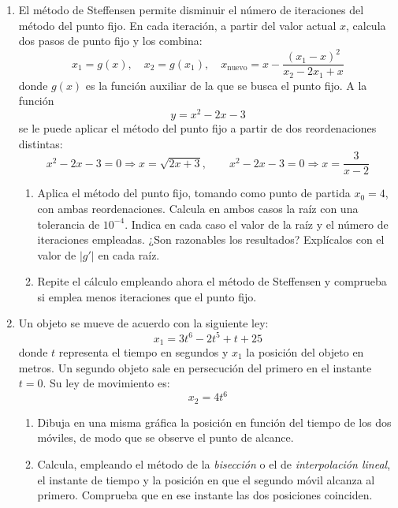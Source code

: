 \begin{enumerate}
\item El método de Steffensen permite disminuir el número de iteraciones del método del punto fijo. En cada iteración, a partir del valor actual $x$, calcula dos pasos de punto fijo y los combina:
\begin{equation*}
x_1=g(x),\quad x_2=g(x_1),\quad x_{\text{nuevo}} = x - \frac{(x_1 -x)^2}{x_2 - 2x_1 + x}
\end{equation*}
donde $g(x)$ es la función auxiliar de la que se busca el punto fijo. A la función
\begin{equation*}
y= x^2-2x-3
\end{equation*}
se le puede aplicar el método del punto fijo a partir de dos reordenaciones distintas:
\begin{equation*}
x^2-2x-3=0 \Rightarrow x=\sqrt{2x+3}, \qquad x^2-2x-3=0 \Rightarrow x=\frac{3}{x-2}
\end{equation*}
\begin{enumerate}
\item Aplica el método del punto fijo, tomando como punto de partida $x_0=4$, con ambas reordenaciones. Calcula en ambos casos la raíz con una tolerancia de $10^{-4}$. Indica en cada caso el valor de la raíz y el número de iteraciones empleadas. ¿Son razonables los resultados? Explícalos con el valor de $\vert g'\vert$ en cada raíz.
\item Repite el cálculo empleando ahora el método de Steffensen y comprueba si emplea menos iteraciones que el punto fijo.
\end{enumerate}

\item Un objeto se mueve de acuerdo con la siguiente ley:
\begin{equation*}
x_1 = 3t^6 - 2t^5 + t + 25
\end{equation*}
donde $t$ representa el tiempo en segundos y $x_1$ la posición del objeto en metros.
Un segundo objeto sale en persecución del primero en el instante $t=0$. Su ley de movimiento es:
\begin{equation*}
x_2 = 4t^6
\end{equation*}
\begin{enumerate}
\item Dibuja en una misma gráfica la posición en función del tiempo de los dos móviles, de modo que se observe el punto de alcance.
\item Calcula, empleando el método de la \emph{bisección} o el de \emph{interpolación lineal}, el instante de tiempo y la posición en que el segundo móvil alcanza al primero. Comprueba que en ese instante las dos posiciones coinciden.
\end{enumerate}


\end{enumerate}
